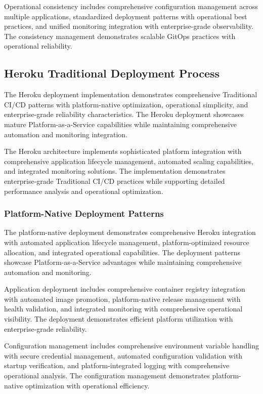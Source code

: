 Operational consistency includes comprehensive configuration management across multiple applications, standardized deployment patterns with operational best practices, and unified monitoring integration with enterprise-grade observability. The consistency management demonstrates scalable GitOps practices with operational reliability.

\subsection{Heroku Traditional Deployment Process}

The Heroku deployment implementation demonstrates comprehensive Traditional CI/CD patterns with platform-native optimization, operational simplicity, and enterprise-grade reliability characteristics. The Heroku deployment showcases mature Platform-as-a-Service capabilities while maintaining comprehensive automation and monitoring integration.

The Heroku architecture implements sophisticated platform integration with comprehensive application lifecycle management, automated scaling capabilities, and integrated monitoring solutions. The implementation demonstrates enterprise-grade Traditional CI/CD practices while supporting detailed performance analysis and operational optimization.

\subsubsection{Platform-Native Deployment Patterns}

The platform-native deployment demonstrates comprehensive Heroku integration with automated application lifecycle management, platform-optimized resource allocation, and integrated operational capabilities. The deployment patterns showcase Platform-as-a-Service advantages while maintaining comprehensive automation and monitoring.

Application deployment includes comprehensive container registry integration with automated image promotion, platform-native release management with health validation, and integrated monitoring with comprehensive operational visibility. The deployment demonstrates efficient platform utilization with enterprise-grade reliability.

Configuration management includes comprehensive environment variable handling with secure credential management, automated configuration validation with startup verification, and platform-integrated logging with comprehensive operational analysis. The configuration management demonstrates platform-native optimization with operational efficiency.

